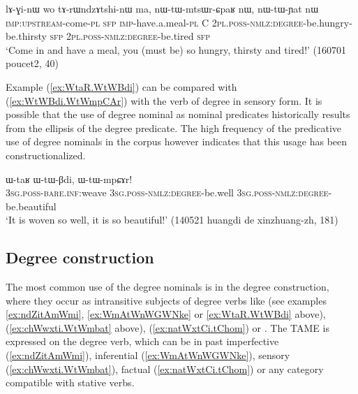 \begin{exe}
\ex \label{ex:nWtWmtsWrCpaR}
\gll lɤ-ɣi-nɯ wo tɤ-rɯndzɤtshi-nɯ ma, nɯ-tɯ-mtsɯr-ɕpaʁ nɯ, nɯ-tɯ-ɲat nɯ\\
\textsc{imp}:\textsc{upstream}-come-\textsc{pl} \textsc{sfp} \textsc{imp}-have.a.meal-\textsc{pl} C \textsc{2pl}.\textsc{poss}-\textsc{nmlz}:\textsc{degree}-be.hungry-be.thirsty \textsc{sfp} \textsc{2pl}.\textsc{poss}-\textsc{nmlz}:\textsc{degree}-be.tired \textsc{sfp} \\
\glt `Come in and have a meal, you (must be) so hungry, thirsty and tired!' (160701 poucet2, 40)
\end{exe}

Example (\ref{ex:WtaR.WtWBdi}) can be compared with (\ref{ex:WtWBdi.WtWmpCAr}) with the verb of degree  in sensory form. It is possible that the use of degree nominal as nominal predicates historically results from the ellipsis of the degree predicate. The high frequency of the predicative use of degree nominals in the corpus however indicates that this usage has been constructionalized.

\begin{exe}
\ex \label{ex:WtWBdi.WtWmpCAr}
\gll ɯ-taʁ ɯ-tɯ-βdi, ɯ-tɯ-mpɕɤr! \\
\textsc{3sg}.\textsc{poss}-\textsc{bare}.\textsc{inf}:weave  \textsc{3sg}.\textsc{poss}-\textsc{nmlz}:\textsc{degree}-be.well \textsc{3sg}.\textsc{poss}-\textsc{nmlz}:\textsc{degree}-be.beautiful  \\
\glt `It is woven so well, it is so beautiful!' (140521 huangdi de xinzhuang-zh, 181)
\end{exe}

\subsection{Degree construction} \label{sec:degree.nominal.construction}
The most common use of the degree nominals is in the degree construction, where they occur as intransitive subjects of degree verbs like  (see examples \ref{ex:ndZitAmWmi}, \ref{ex:WmAtWnWGWNke} or \ref{ex:WtaR.WtWBdi} above),  (\ref{ex:chWwxti.WtWmbat} above),  (\ref{ex:natWxtCi.tChom}) or . The TAME is expressed on the degree verb, which can be in past imperfective (\ref{ex:ndZitAmWmi}), inferential (\ref{ex:WmAtWnWGWNke}), sensory (\ref{ex:chWwxti.WtWmbat}), factual (\ref{ex:natWxtCi.tChom}) or any category compatible with stative verbs.

